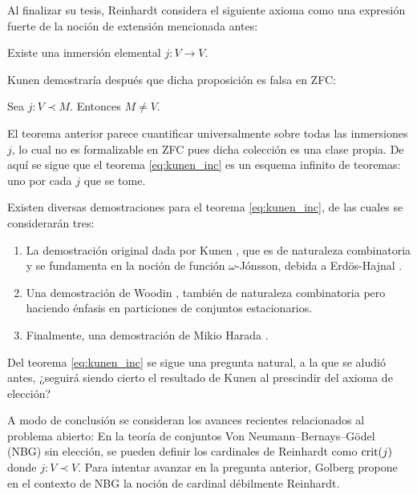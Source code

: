 \documentclass[12pt]{article}
\begin{document}
    Al finalizar su tesis, Reinhardt considera el siguiente axioma como una expresión fuerte
    de la noción de extensión mencionada antes:
    \begin{prop}
        Existe una inmersión elemental $j\colon V\to V$.
    \end{prop}

    Kunen \cite{kunen_elementary_1971} demostraría después que dicha proposición es falsa
    en ZFC:
    \begin{teo}
        Sea $j\colon V\prec M$. Entonces $M\neq V$.
    \end{teo}

    El teorema anterior parece cuantificar universalmente sobre todas las inmersiones $j$,
    lo cual no es formalizable en ZFC pues dicha colección es una clase propia. De aquí se sigue
    que el teorema \ref{eq:kunen_inc} es un esquema infinito de teoremas: uno por cada $j$ que se tome.

    Existen diversas demostraciones para el teorema \ref{eq:kunen_inc}, de las cuales se considerarán tres:
    \begin{enumerate}
        \item La demostración original dada por Kunen \cite{kunen_elementary_1971}, que
              es de naturaleza combinatoria y se fundamenta en la noción de función
              $\omega$-Jónsson, debida a Erdös-Hajnal \cite{erdos_problem_1966}.
        \item Una demostración de Woodin \cite[Pág 320]{kanamori_higher_2009}, también de naturaleza combinatoria
              pero haciendo énfasis en particiones de conjuntos estacionarios.
        \item Finalmente, una demostración de Mikio Harada \cite[Pág 321]{kanamori_higher_2009}.
    \end{enumerate}


    Del teorema \ref{eq:kunen_inc} se sigue una pregunta natural, a la que se aludió antes, ¿seguirá siendo
    cierto el resultado de Kunen al prescindir del axioma de elección? 

    A modo de conclusión se consideran los avances recientes relacionados al problema abierto:
    En la teoría de conjuntos Von Neumann–Bernays–Gödel (NBG) sin elección, se pueden definir los cardinales de Reinhardt como $\mathrm { crit } ( j )$
    donde $j\colon V\prec V$. Para intentar avanzar en la pregunta anterior,
    Golberg \cite{goldberg_reinhardt_2021} propone en el contexto de NBG la noción de cardinal débilmente Reinhardt.
    
\end{document}
